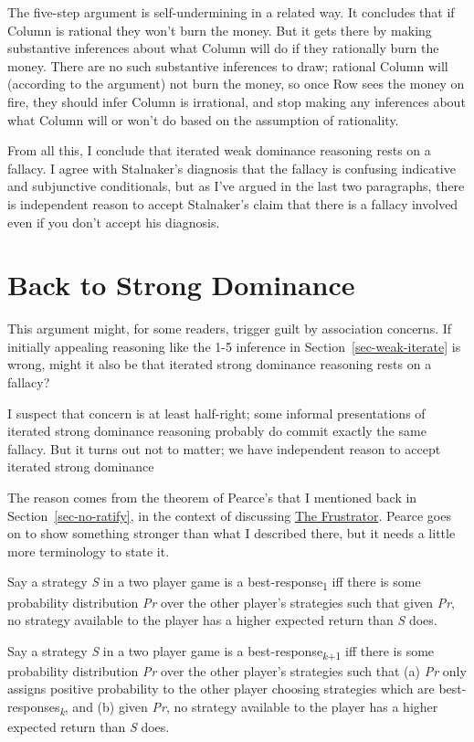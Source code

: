 \documentclass[
  12pt,
  letterpaper,
  DIV=11,
  numbers=noendperiod]{scrreprt}
\begin{document}
The five-step argument is self-undermining in a related way. It
concludes that if Column is rational they won't burn the money. But it
gets there by making substantive inferences about what Column will do if
they rationally burn the money. There are no such substantive inferences
to draw; rational Column will (according to the argument) not burn the
money, so once Row sees the money on fire, they should infer Column is
irrational, and stop making any inferences about what Column will or
won't do based on the assumption of rationality.

From all this, I conclude that iterated weak dominance reasoning rests
on a fallacy. I agree with Stalnaker's diagnosis that the fallacy is
confusing indicative and subjunctive conditionals, but as I've argued in
the last two paragraphs, there is independent reason to accept
Stalnaker's claim that there is a fallacy involved even if you don't
accept his diagnosis.

\section{Back to Strong Dominance}\label{sec-weak-strong}

This argument might, for some readers, trigger guilt by association
concerns. If initially appealing reasoning like the 1-5 inference in
Section~\ref{sec-weak-iterate} is wrong, might it also be that iterated
strong dominance reasoning rests on a fallacy?

I suspect that concern is at least half-right; some informal
presentations of iterated strong dominance reasoning probably do commit
exactly the same fallacy. But it turns out not to matter; we have
independent reason to accept iterated strong dominance

The reason comes from the theorem of Pearce's that I mentioned back in
Section~\ref{sec-no-ratify}, in the context of discussing
\hyperref[tbl-frustrator]{The Frustrator}. Pearce goes on to show
something stronger than what I described there, but it needs a little
more terminology to state it.

Say a strategy \emph{S} in a two player game is a
best-response\textsubscript{1} iff there is some probability
distribution \emph{Pr} over the other player's strategies such that
given \emph{Pr}, no strategy available to the player has a higher
expected return than \emph{S} does.

Say a strategy \emph{S} in a two player game is a
best-response\textsubscript{\emph{k}+1} iff there is some probability
distribution \emph{Pr} over the other player's strategies such that (a)
\emph{Pr} only assigns positive probability to the other player choosing
strategies which are best-responses\textsubscript{\emph{k}}, and (b)
given \emph{Pr}, no strategy available to the player has a higher
expected return than \emph{S} does.
\end{document}
